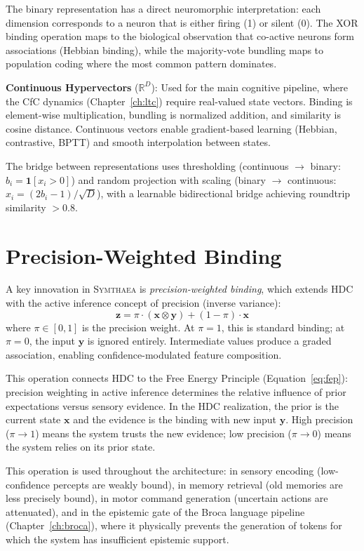 \documentclass[12pt]{book}
\newcommand{\bind}{\otimes}
\newcommand{\symthaea}{\textsc{Symthaea}}
\newcommand{\R}{\mathbb{R}}
\begin{document}
The binary representation has a direct neuromorphic interpretation: each dimension corresponds to a neuron that is either firing (1) or silent (0). The XOR binding operation maps to the biological observation that co-active neurons form associations (Hebbian binding), while the majority-vote bundling maps to population coding where the most common pattern dominates.

\textbf{Continuous Hypervectors} ($\R^D$): Used for the main cognitive pipeline, where the CfC dynamics (Chapter~\ref{ch:ltc}) require real-valued state vectors. Binding is element-wise multiplication, bundling is normalized addition, and similarity is cosine distance. Continuous vectors enable gradient-based learning (Hebbian, contrastive, BPTT) and smooth interpolation between states.

The bridge between representations uses thresholding (continuous $\to$ binary: $b_i = \mathbf{1}[x_i > 0]$) and random projection with scaling (binary $\to$ continuous: $x_i = (2b_i - 1) / \sqrt{D}$), with a learnable bidirectional bridge achieving roundtrip similarity $> 0.8$.

\section{Precision-Weighted Binding}

A key innovation in \symthaea{} is \textit{precision-weighted binding}, which extends HDC with the active inference concept of precision (inverse variance):
\begin{equation}\label{eq:precision-binding}
\mathbf{z} = \pi \cdot (\mathbf{x} \bind \mathbf{y}) + (1 - \pi) \cdot \mathbf{x}
\end{equation}
where $\pi \in [0, 1]$ is the precision weight. At $\pi = 1$, this is standard binding; at $\pi = 0$, the input $\mathbf{y}$ is ignored entirely. Intermediate values produce a graded association, enabling confidence-modulated feature composition.

This operation connects HDC to the Free Energy Principle (Equation~\ref{eq:fep}): precision weighting in active inference determines the relative influence of prior expectations versus sensory evidence. In the HDC realization, the prior is the current state $\mathbf{x}$ and the evidence is the binding with new input $\mathbf{y}$. High precision ($\pi \to 1$) means the system trusts the new evidence; low precision ($\pi \to 0$) means the system relies on its prior state.

This operation is used throughout the architecture: in sensory encoding (low-confidence percepts are weakly bound), in memory retrieval (old memories are less precisely bound), in motor command generation (uncertain actions are attenuated), and in the epistemic gate of the Broca language pipeline (Chapter~\ref{ch:broca}), where it physically prevents the generation of tokens for which the system has insufficient epistemic support.
\end{document}
